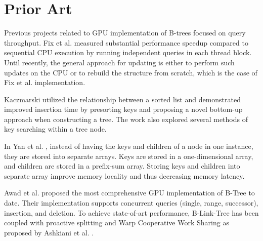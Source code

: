 \section{Prior Art}




Previous projects related to GPU implementation of B-trees focused on query throughput. Fix et al. \cite{fix2011accelerating} measured substantial performance speedup compared to sequential CPU execution by running independent queries in each thread block. Until recently, the general approach for updating is either to perform such updates on the CPU or to rebuild the structure from scratch, which is the case of Fix et al. implementation.

Kaczmarski \cite{kaczmarski} utilized the relationship between a sorted list and demonstrated improved insertion time by presorting keys and proposing a novel bottom-up approach when constructing a tree. The work also explored several methods of key searching within a tree node.

In Yan et al. \cite{harmonia}, instead of having the keys and children of a node in one instance, they are stored into separate arrays. Keys are stored in a one-dimensional array, and children are stored in a prefix-sum array. Storing keys and children into separate array improve memory locality and thus decreasing memory latency.

Awad et al. \cite{awad} proposed the most comprehensive GPU implementation of B-Tree to date. Their implementation supports concurrent queries (single, range, successor), insertion, and deletion. To achieve state-of-art performance, B-Link-Tree has been coupled with proactive splitting and Warp Cooperative Work Sharing as proposed by Ashkiani et al. \cite{ashkiani2018dynamic}.


